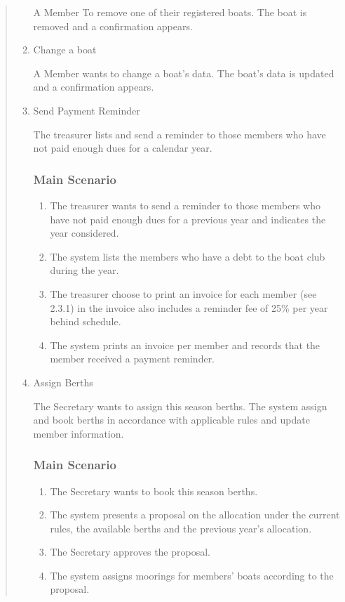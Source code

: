 \begin{quote}
\begin{enumerate}
  A Member To remove one of their registered boats. The boat is removed
  and a confirmation appears.
  

  \item
  Change a boat
  
  A Member wants to change a boat's data. The boat's data is updated and a
  confirmation appears.
  

  \item
  Send Payment Reminder
  
  The treasurer lists and send a reminder to those members who have not
  paid enough dues for a calendar year.
  
  \subsubsection*{Main Scenario}
  \begin{enumerate}
    \tightlist
    \item
      The treasurer wants to send a reminder to those members who have not
      paid enough dues for a previous year and indicates the year
      considered.
    \item
      The system lists the members who have a debt to the boat club during
      the year.
    \item
      The treasurer choose to print an invoice for each member (see 2.3.1)
      in the invoice also includes a reminder fee of 25\% per year behind
      schedule.
    \item
      The system prints an invoice per member and records that the member
      received a payment reminder.
  \end{enumerate}
  

  \item
  Assign Berths
  
  The Secretary wants to assign this season berths. The system assign and
  book berths in accordance with applicable rules and update member
  information.
  
  \subsubsection*{Main Scenario}
  \begin{enumerate}
    \tightlist
    \item
      The Secretary wants to book this season berths.
    \item
      The system presents a proposal on the allocation under the current
      rules, the available berths and the previous year's allocation.
    \item
      The Secretary approves the proposal.
    \item
      The system assigns moorings for members' boats according to the
      proposal.
  \end{enumerate}
  


\end{enumerate}
\end{quote}

